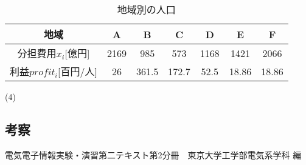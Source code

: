 \documentclass[]{jsarticle}
\begin{document}
    \begin{table}
      \begin{center}
        \caption{地域別の人口\cite{t}}
        \begin{tabular}{|c|c|c|c|c|c|c|} \hline
          地域 & A & B & C & D & E & F \\ \hline
          分担費用$x_i$[億円] & 2169 & 985 & 573 & 1168 & 1421 & 2066 \\ \hline
          利益$profit_i$[百円/人] & 26 & 361.5 & 172.7 & 52.5 & 18.86 & 18.86 \\ \hline
        \end{tabular}
        \label{ans53}
      \end{center}
    \end{table}

    (4)


    \subsection{考察}



  \begin{thebibliography}{9}
     電気電子情報実験・演習第二テキスト第2分冊　東京大学工学部電気系学科 編
  \end{thebibliography}
\end{document}
